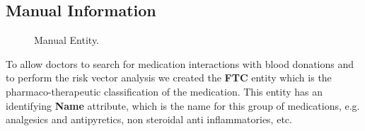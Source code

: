 %
%
%
%

\subsection{Manual Information}

\begin{figure}[H]
	\begin{center}
	\end{center}
	\caption{Manual Entity.}\label{fig:manual_entity}
\end{figure}

To allow doctors to search for medication interactions with blood donations and to perform the risk vector analysis we created the \textbf{FTC} entity which is the pharmaco-therapeutic classification of the medication.
This entity has an identifying \textbf{Name} attribute, which is the name for this group of medications, e.g. analgesics and antipyretics, non steroidal anti inflammatories, etc.

